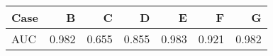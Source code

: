\begin{tabular}{l|rrrrrr}
Case & B & C & D & E & F & G \\ \hline
AUC & 0.982  &  0.655  &  0.855  &  0.983  &  0.921  &  0.982 
\end{tabular}
